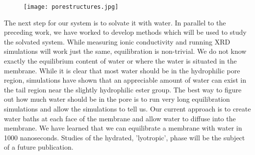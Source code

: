 \begin{figure}
\caption{}
\label{figure:metastable}
\texttt{[image: porestructures.jpg]}
\centering
\end{figure}

The next step for our system is to solvate it with water. In parallel 
to the preceding work, we have worked to develop methods which will be
used to study the solvated system. While measuring ionic conductivity 
and running XRD simulations will work just the same, equilibration is 
non-trivial. We do not know exactly the equilibrium content of water 
or where the water is situated in the membrane. While it is clear that 
most water should be in the hydrophilic pore region, simulations have shown that an 
appreciable amount of water can exist in the tail region near the 
slightly hydrophilic ester group. The best way to figure out how much 
water should be in the pore is to run very long equilibration simulations
and allow the simulations to tell us. Our current approach is to create
water baths at each face of the membrane and allow water to diffuse into
the membrane. We have learned that we can equilibrate a membrane with
water in 1000 nanoseconds. Studies of the hydrated, 'lyotropic', phase
will be the subject of a future publication.
